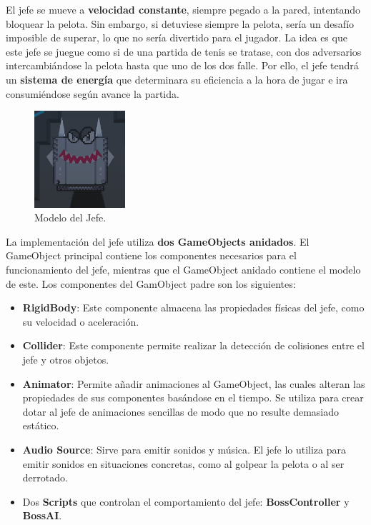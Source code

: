 El jefe se mueve a \textbf{velocidad constante}, siempre pegado a la pared, intentando bloquear la pelota. Sin embargo, si detuviese siempre la pelota, sería un desafío imposible de superar, lo que no sería divertido para el jugador. La idea es que este jefe se juegue como si de una partida de tenis se tratase, con dos adversarios intercambiándose la pelota hasta que uno de los dos falle. Por ello, el jefe tendrá un \textbf{sistema de energía} que determinara su eficiencia a la hora de jugar e ira consumiéndose según avance la partida.

\begin{figure}[h]
	\includegraphics[width=0.30\textwidth]{images/estructura/jefe/boss-captura}
	\centering
	\caption{Modelo del Jefe.}
\end{figure}

La implementación del jefe utiliza \textbf{dos GameObjects anidados}. El GameObject principal contiene los componentes necesarios para el funcionamiento del jefe, mientras que el GameObject anidado contiene el modelo de este. Los componentes del GamObject padre son los siguientes:
 \begin{itemize}
	\item \textbf{RigidBody}: Este componente almacena las propiedades físicas del jefe, como su velocidad o aceleración.
	\item \textbf{Collider}: Este componente permite realizar la detección de colisiones entre el jefe y otros objetos.
	\item \textbf{Animator}: Permite añadir animaciones al GameObject, las cuales alteran las propiedades de sus componentes basándose en el tiempo. Se utiliza para crear dotar al jefe de animaciones sencillas de modo que no resulte demasiado estático.
	\item \textbf{Audio Source}: Sirve para emitir sonidos y música. El jefe lo utiliza para emitir sonidos en situaciones concretas, como al golpear la pelota o al ser derrotado.
	\item Dos \textbf{Scripts} que controlan el comportamiento del jefe: \textbf{BossController} y \textbf{BossAI}.
\end{itemize}

